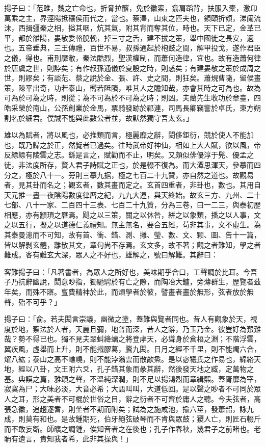 \begin{pinyinscope}
揚子曰：「范雎，魏之亡命也，折脅拉髂，免於徽索，翕肩蹈背，扶服入橐，激卬萬乘之主，界涇陽抵穰侯而代之，當也。蔡澤，山東之匹夫也，顉頤折頞，涕阑流沫，西揖彊秦之相，搤其咽，炕其氣，附其背而奪其位，時也。天下已定，金革已平，都於雒陽，婁敬委輅脫輓，掉三寸之舌，建不拔之策，舉中國徙之長安，適也。五帝垂典，三王傳禮，百世不易，叔孫通起於枹鼓之間，解甲投戈，遂作君臣之儀，得也。甫刑靡敝，秦法酷烈，聖漢權制，而蕭何造律，宜也。故有造蕭何律於唐虞之世，則誖矣；有作叔孫通儀於夏殷之時，則惑矣；有建婁敬之策於成周之世，則繆矣；有談范、蔡之說於金、張、許、史之間，則狂矣。蕭規曹隨，留侯畫策，陳平出奇，功若泰山，嚮若阺隤，唯其人之贍知哉，亦會其時之可為也。故為可為於可為之時，則從；為不可為於不可為之時；則凶。夫藺先生收功於章臺，四皓采榮於南山，公孫創業於金馬，票騎發跡於祁連，司馬長卿竊訾於卓氏，東方朔割名於細君。僕誠不能與此數公者並，故默然獨守吾太玄。」

雄以為賦者，將以風也，必推類而言，極麗靡之辭，閎侈鉅衍，競於使人不能加也，既乃歸之於正，然覽者已過矣。往時武帝好神仙，相如上大人賦，欲以風，帝反縹縹有陵雲之志。繇是言之，賦勸而不止，明矣。又頗似俳優淳于髡、優孟之徒，非法度所存，賢人君子詩賦之正也，於是輟不復為。而大潭思渾天，參摹而四分之，極於八十一。旁則三摹九据，極之七百二十九贊，亦自然之道也。故觀易者，見其卦而名之；觀玄者，數其畫而定之。玄首四重者，非卦也，數也。其用自天元推一晝一夜陰陽數度律曆之紀，九九大運，與天終始。故玄三方、九州、二十七部、八十一家、二百四十三表、七百二十九贊，分為三卷，曰一二三，與泰初歷相應，亦有顓頊之曆焉。飓之以三策，關之以休咎，絣之以象類，播之以人事，文之以五行，擬之以道德仁義禮知。無主無名，要合五經，苟非其事，文不虛生。為其泰曼漶而不可知，故有首、衝、錯、測、攡、瑩、數、文、颗、圖、告十一篇，皆以解剝玄體，離散其文，章句尚不存焉。玄文多，故不著；觀之者難知，學之者難成。客有難玄大深，眾人之不好也，雄解之，號曰解難。其辭曰：

客難揚子曰：「凡著書者，為眾人之所好也，美味期乎合口，工聲調於比耳。今吾子乃抗辭幽說，閎意眇指，獨馳騁於有亡之際，而陶冶大鑪，旁薄群生，歷覽者茲年矣，而殊不寤。亶費精神於此，而煩學者於彼，譬畫者畫於無形，弦者放於無聲，殆不可乎？」

揚子曰：「俞。若夫閎言崇議，幽微之塗，蓋難與覽者同也。昔人有觀象於天，視度於地，察法於人者，天麗且彌，地普而深，昔人之辭，乃玉乃金。彼豈好為艱難哉？勢不得已也。獨不見夫翠虯絳螭之將登虖天，必聳身於倉梧之淵；不階浮雲，翼疾風，虛舉而上升，則不能撠膠葛，騰九閎。日月之經不千里，則不能燭六合，燿八紘；泰山之高不嶕嶢，則不能浡滃雲而散歊烝。是以宓犧氏之作易也，綿絡天地，經以八卦，文王附六爻，孔子錯其象而彖其辭，然後發天地之臧，定萬物之基。典謨之篇，雅頌之聲，不溫純深潤，則不足以揚鴻烈而章緝熙。蓋胥靡為宰，寂寞為尸；大味必淡，大音必希；大語叫叫，大道低回。是以聲之眇者不可同於眾人之耳，形之美者不可棍於世俗之目，辭之衍者不可齊於庸人之聽。今夫弦者，高張急徽，追趨逐耆，則坐者不期而附矣；試為之施咸池，揄六莖，發蕭韶，詠九成，則莫有和也。是故鍾期死，伯牙絕弦破琴而不肯與眾鼓；獿人亡，則匠石輟斤而不敢妄斲。師曠之調鍾，俟知音者之在後也；孔子作春秋，幾君子之前睹也。老聃有遺言，貴知我者希，此非其操與！」


\end{pinyinscope}

